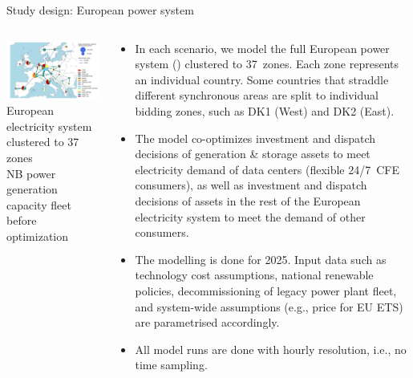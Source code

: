 \begin{frame}{Study design: European power system}
  
  {\footnotesize
  \begin{columns}[T]

  \begin{column}{7cm}
  \centering

  \vspace{0.6cm}
  \includegraphics[width=7.7cm]{images/map-fleet.png}
  {\scriptsize European electricity system clustered to 37 zones \\ 
  NB power generation capacity fleet before optimization}
  \end{column}

  \begin{column}{8cm}
  \begin{itemize}
  \vspace{-0.2cm}
  \item In each scenario, we model the full European power system () 
  clustered to \alert{37~zones}. Each zone represents an individual country. Some countries
  that straddle different synchronous areas are split to individual bidding zones, 
  such as DK1 (West) and DK2 (East).

  \item The model \alert{co-optimizes} investment and dispatch decisions of generation \& storage assets to meet electricity demand of data centers (flexible 24/7~CFE consumers), as well as investment and dispatch decisions of assets in the rest of the European electricity system to meet the demand of other consumers. 
  
  \item The modelling is done for \alert{2025}. Input data such as technology cost assumptions,
  national renewable policies, decommissioning of legacy power plant fleet, and system-wide assumptions (e.g., price for EU ETS) are parametrised accordingly.

  \item All model runs are done with \alert{hourly resolution}, i.e., no time sampling.
  
  \end{itemize}

  \end{column}
  \end{columns}
  }

\end{frame}



